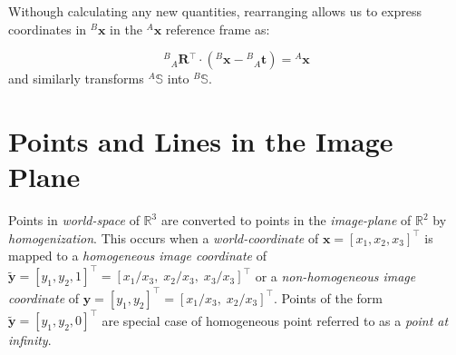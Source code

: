 \documentclass[12pt]{report}
\newcommand{\tR}[0]{\ensuremath{^{A}}}
\newcommand{\bR}[0]{\ensuremath{_{A}}}
\newcommand{\tL}[0]{\ensuremath{^{B}}}
\newcommand{\tT}[0]{\ensuremath{^{\intercal}}}
\newcommand{\xL}[0]{\ensuremath{{\tL\mathbf{x}}}}
\newcommand{\xR}[0]{\ensuremath{{\tR\mathbf{x}}}}
\newcommand{\rLR}[0]{\ensuremath{{\tL\bR}\mathbf{R}}}
\newcommand{\rLt}[0]{\ensuremath{{\tL\bR}\mathbf{t}}}
\newcommand{\sR}[0]{\ensuremath{^{A}\mathbb{S}}}
\newcommand{\sL}[0]{\ensuremath{^{B}\mathbb{S}}}
\begin{document}
\par Withough calculating any new quantities, rearranging allows us to express coordinates in $\xL$ in the $\xR$ reference frame as:

\par \begin{equation*}
	{\rLR\tT}\cdot (\xL - \rLt ) = \xR
\end{equation*}
and similarly transforms $\sR$ into $\sL$.

\section{Points and Lines in the Image Plane}

\par Points in \textit{world-space} of $\mathbb{R}^3$ are converted to points in the \textit{image-plane} of $\mathbb{R}^2$ by \textit{homogenization}. This occurs when a \textit{world-coordinate} of $\mathbf{x}=[x_1,x_2,x_3]^\intercal$ is mapped to a \textit{homogeneous image coordinate} of $\mathbf{\tilde{y}}=[y_1,y_2,1]^\intercal=[x_1/x_3,\;x_2/x_3,\;x_3/x_3]^\intercal$ or a \textit{non-homogeneous image coordinate} of $\mathbf{y}=[y_1,y_2]^\intercal=[x_1/x_3,\;x_2/x_3]^\intercal$. Points of the form $\mathbf{\tilde{y}}=[y_1,y_2,0]^\intercal$ are special case of homogeneous point referred to as a \textit{point at infinity}.
\end{document}
